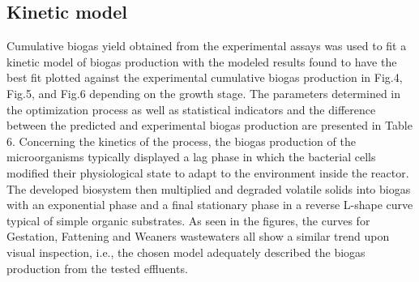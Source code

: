 \subsection{Kinetic model}
Cumulative biogas yield obtained from the experimental assays was used to fit a kinetic model of biogas production with the modeled results found to have the best fit plotted against the experimental cumulative biogas production in Fig.4, Fig.5, and Fig.6 depending on the growth stage. The parameters determined in the optimization process as well as statistical indicators and the difference between the predicted and experimental biogas production are presented in Table 6.
Concerning the kinetics of the process, the biogas production of the microorganisms typically displayed a lag phase in which the bacterial cells modified their physiological state to adapt to the environment inside the reactor. The developed biosystem then multiplied and degraded volatile solids into biogas with an exponential phase and a final stationary phase in a reverse L-shape curve typical of simple organic substrates. As seen in the figures, the curves for Gestation, Fattening and Weaners wastewaters all show a similar trend upon visual inspection, i.e., the chosen model adequately described the biogas production from the tested effluents.